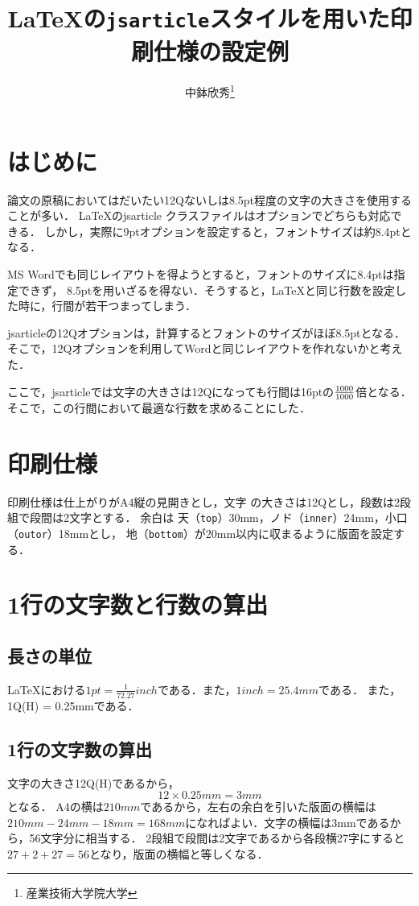 \documentclass[a4j, 12Q, twocolumn, twoside]{jsarticle}
\title{\LaTeX の\texttt{jsarticle}スタイルを用いた印刷仕様の設定例}
\author{中鉢欣秀\thanks{産業技術大学院大学}}
\begin{document}
\maketitle
\section{はじめに}
  論文の原稿においてはだいたい12Qないしは8.5pt程度の文字の大きさを使用することが多い．
  \LaTeX のjsarticle クラスファイルはオプションでどちらも対応できる．
  しかし，実際に9ptオプションを設定すると，フォントサイズは約8.4ptとなる．
  
  MS Wordでも同じレイアウトを得ようとすると，フォントのサイズに8.4ptは指定できず，
  8.5ptを用いざるを得ない．そうすると，\LaTeX と同じ行数を設定した時に，行間が若干つまってしまう．
  
  jsarticleの12Qオプションは，計算するとフォントのサイズがほぼ8.5ptとなる．
  そこで，12Qオプションを利用してWordと同じレイアウトを作れないかと考えた．
  
  ここで，jsarticleでは文字の大きさは12Qになっても行間は16ptの$\frac{\the\mag}{1000}$倍となる．
  そこで，この行間において最適な行数を求めることにした．
\section{印刷仕様}

  印刷仕様は仕上がりがA4縦の見開きとし，文字
  の大きさは12Qとし，段数は2段組で段間は2文字とする．
  余白は
  天（\texttt{top}）30mm，ノド（\texttt{inner}）24mm，小口（\texttt{outor}）18mmとし，
  地（\texttt{bottom}）が20mm以内に収まるように版面を設定する．

\section{1行の文字数と行数の算出}
  \subsection{長さの単位}
  \LaTeX における$1 pt = \frac{1}{72.27} inch$である．また，$1 inch = 25.4 mm$である．
  また，1Q(H) = 0.25mmである．
  
  \subsection{1行の文字数の算出}
  文字の大きさ12Q(H)であるから，
  \[ 12 \times 0.25 mm = 3 mm \]
  となる．  
  A4の横は$210mm$であるから，左右の余白を引いた版面の横幅は
  $210mm - 24mm - 18mm = 168mm$になればよい．文字の横幅は3mmであるから，56文字分に相当する．
  2段組で段間は2文字であるから各段横27字にすると$ 27 + 2 + 27 = 56 $となり，版面の横幅と等しくなる．
\end{document}
